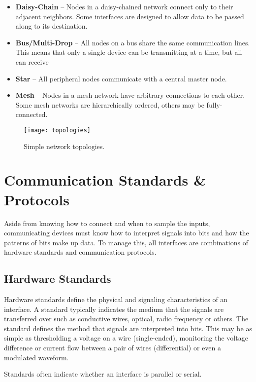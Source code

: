 \documentclass[11pt,fleqn]{book} %
\begin{document}
\begin{itemize}
    \item \textbf{Daisy-Chain} -- Nodes in a daisy-chained network connect only to their adjacent neighbors. Some interfaces are designed to allow data to be passed along to its destination. 
    \item \textbf{Bus/Multi-Drop} -- All nodes on a bus share the same communication lines. This means that only a single device can be transmitting at a time, but all can receive
    \item \textbf{Star} -- All peripheral nodes communicate with a central master node.
    \item \textbf{Mesh} -- Nodes in a mesh network have arbitrary connections to each other. Some mesh networks are hierarchically ordered, others may be fully-connected.   
\end{itemize}



\begin{figure}[]
    \centering\texttt{[image: topologies]}
    \caption{Simple network topologies.}
    \label{topologies}
\end{figure}

\section{Communication Standards \& Protocols}

Aside from knowing how to connect and when to sample the inputs, communicating devices must know how to interpret signals into bits and how the patterns of bits make up data. To manage this, all interfaces are combinations of hardware standards and communication protocols. 

\subsection{Hardware Standards}	
Hardware standards define the physical and signaling characteristics of an interface.
A standard typically indicates the medium that the signals are transferred over such as conductive wires, optical, radio frequency or others. The standard defines the method that signals are interpreted into bits. This may be as simple as thresholding a voltage on a wire (single-ended), monitoring the voltage difference or current flow between a pair of wires (differential) or even a modulated waveform. 

Standards often indicate whether an interface is parallel or serial.
\end{document}

